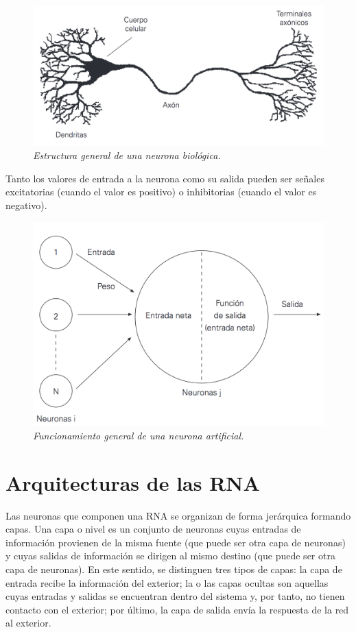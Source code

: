 \documentclass[]{book}
\begin{document}
\begin{figure}
\centering
\includegraphics{figures/neurona.png}
\caption{\emph{Estructura general de una neurona biológica.}}
\end{figure}

Tanto los valores de entrada a la neurona como su salida pueden ser
señales excitatorias (cuando el valor es positivo) o inhibitorias
(cuando el valor es negativo).

\begin{figure}
\centering
\includegraphics{figures/neurona_artificial.png}
\caption{\emph{Funcionamiento general de una neurona artificial.}}
\end{figure}

\section{Arquitecturas de las RNA}\label{arquitecturas-de-las-rna}

Las neuronas que componen una RNA se organizan de forma jerárquica
formando capas. Una capa o nivel es un conjunto de neuronas cuyas
entradas de información provienen de la misma fuente (que puede ser otra
capa de neuronas) y cuyas salidas de información se dirigen al mismo
destino (que puede ser otra capa de neuronas). En este sentido, se
distinguen tres tipos de capas: la capa de entrada recibe la información
del exterior; la o las capas ocultas son aquellas cuyas entradas y
salidas se encuentran dentro del sistema y, por tanto, no tienen
contacto con el exterior; por último, la capa de salida envía la
respuesta de la red al exterior.
\end{document}
